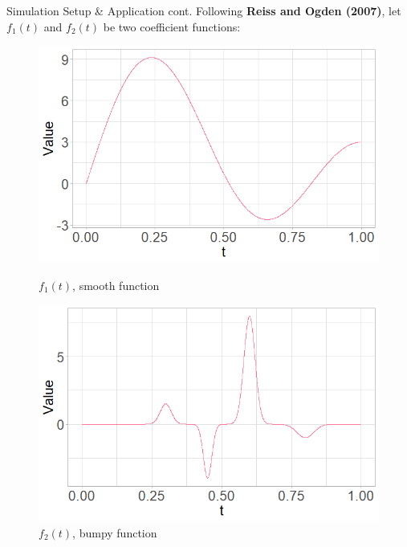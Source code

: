 \documentclass{beamer}
\begin{document}
	
	\begin{frame}{Simulation Setup \& Application cont.}
		Following \textbf{Reiss and Ogden (2007)}, let $f_1(t)$ and $f_2(t)$ be two coefficient functions: 

   		
		
		\vspace{0.1cm}
		\begin{figure}
			\centering
			\begin{minipage}{.5\textwidth}
				\centering
  				\includegraphics[width=\textwidth]{smooth_function.png}
  				\caption{$f_1(t)$, smooth function}
  				\label{fig:test1}
			\end{minipage}%
			\begin{minipage}{.5\textwidth}
	  			\centering
  				\includegraphics[width=\textwidth]{bumpy_function.png}
  				\caption{$f_2(t)$, bumpy function}
  				\label{fig:test2}
			\end{minipage}
		\end{figure}
		
	\end{frame}	
\end{document}
